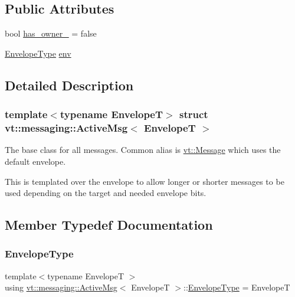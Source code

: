 \subsection*{Public Attributes}
\begin{DoxyCompactItemize}
\item 
bool \hyperlink{structvt_1_1messaging_1_1_active_msg_a8cdaa2d7bbf2529831a6e7434132d385}{has\+\_\+owner\+\_\+} = false
\item 
\hyperlink{structvt_1_1messaging_1_1_active_msg_a6e2b0541c25f7290555bf50d7cc05874}{Envelope\+Type} \hyperlink{structvt_1_1messaging_1_1_active_msg_ae3f8937b2c95f548f1a3c3340b887c09}{env}
\end{DoxyCompactItemize}


\subsection{Detailed Description}
\subsubsection*{template$<$typename EnvelopeT$>$\newline
struct vt\+::messaging\+::\+Active\+Msg$<$ Envelope\+T $>$}

The base class for all messages. Common alias is {\ttfamily \hyperlink{namespacevt_a3a3ddfef40b4c90915fa43cdd5f129ea}{vt\+::\+Message}} which uses the default envelope. 

This is templated over the envelope to allow longer or shorter messages to be used depending on the target and needed envelope bits. 

\subsection{Member Typedef Documentation}
\mbox{\label{structvt_1_1messaging_1_1_active_msg_a6e2b0541c25f7290555bf50d7cc05874}} 
\subsubsection{\texorpdfstring{Envelope\+Type}{EnvelopeType}}
{\footnotesize\ttfamily template$<$typename EnvelopeT $>$ \\
using \hyperlink{structvt_1_1messaging_1_1_active_msg}{vt\+::messaging\+::\+Active\+Msg}$<$ EnvelopeT $>$\+::\hyperlink{structvt_1_1messaging_1_1_active_msg_a6e2b0541c25f7290555bf50d7cc05874}{Envelope\+Type} =  EnvelopeT}



